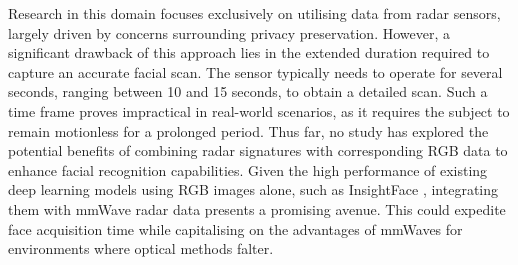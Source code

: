 \documentclass{mpaper}
\begin{document}
Research in this domain focuses exclusively on utilising data from radar sensors, largely driven by concerns surrounding privacy preservation. However, a significant drawback of this approach lies in the extended duration required to capture an accurate facial scan. The sensor typically needs to operate for several seconds, ranging between 10 and 15 seconds, to obtain a detailed scan. Such a time frame proves impractical in real-world scenarios, as it requires the subject to remain motionless for a prolonged period. Thus far, no study has explored the potential benefits of combining radar signatures with corresponding RGB data to enhance facial recognition capabilities. Given the high performance of existing deep learning models using RGB images alone, such as InsightFace \cite{deng2018arcface}, integrating them with mmWave radar data presents a promising avenue. This could expedite face acquisition time while capitalising on the advantages of mmWaves for environments where optical methods falter.
\end{document}
